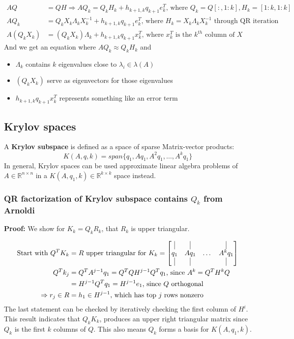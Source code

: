 \documentclass{article}
\begin{document}
\begin{align*}
    AQ &= QH \Longrightarrow AQ_k = Q_kH_k + h_{k+1,k}q_{k+1}e_k^T \textrm{, where } Q_k = Q[:, 1:k], H_k = [1:k, 1:k]\\
    AQ_k &= Q_kX_k\Lambda_k X_k^{-1} + h_{k+1,k}q_{k+1}e_k^T \textrm{, where } H_k = X_k\Lambda_k X_k^{-1} \textrm{ through QR iteration}\\
    A(Q_kX_k) &= (Q_kX_k)\Lambda_k + h_{k+1,k}q_{k+1}x_k^T \textrm{, where } x_k^T \textrm{ is the $k^{th}$ column of } X
\end{align*}
And we get an equation where $AQ_k \approx Q_kH_k$ and
\begin{itemize}
    \item $\Lambda_k$ contains $k$ eigenvalues close to $\lambda_i \in \lambda(A)$
    \item $(Q_kX_k)$ serve as eigenvectors for those eigenvalues
    \item $h_{k+1,k}q_{k+1}x_k^T$ represents something like an error term
\end{itemize}

\subsection{Krylov spaces}
A \textbf{Krylov subspace} is defined as a space of sparse Matrix-vector products:
\begin{equation*}
    K(A, q, k) = span\{q_1, Aq_1, A^2q_1, \dots, A^kq_1 \}
\end{equation*}
In general, Krylov spaces can be used approximate linear algebra problems of $A \in \mathbb{R}^{n \times n}$ in a $K(A, q_1, k) \in \mathbb{R}^{k \times k}$ space instead.

\subsubsection{QR factorization of Krylov subspace contains $Q_k$ from Arnoldi}
\textbf{Proof:} We show for $K_k = Q_kR_k$, that $R_k$ is upper triangular.

\begin{align*}
    \textrm{Start with } Q^TK_k &= R \textrm{ upper triangular for } K_k = \begin{bmatrix}
        \vline & \vline & & \vline \\ q_1 & Aq_1& \dots & A^kq_1 \\ \vline & \vline & & \vline \end{bmatrix}\\
        Q^Tk_j &= Q^TA^{j-1}q_1 = Q^T Q H^{j-1} Q^T q_1 \textrm{, since } A^k = Q^T H^k Q\\
        &= H^{j-1} Q^T q_1 = H^{j-1} e_1 \textrm{, since $Q$ orthogonal}\\
        \Rightarrow r_j \in R &= h_1 \in H^{j-1} \textrm{, which has top $j$ rows nonzero}
\end{align*}
The last statement can be checked by iteratively checking the first column of $H^i$. This result indicates that $Q_kK_k$, produces an upper right triangular matrix since $Q_k$ is the first $k$ columns of $Q$. This also means $Q_k$ forms a basis for $K(A, q_1, k)$.
\end{document}
